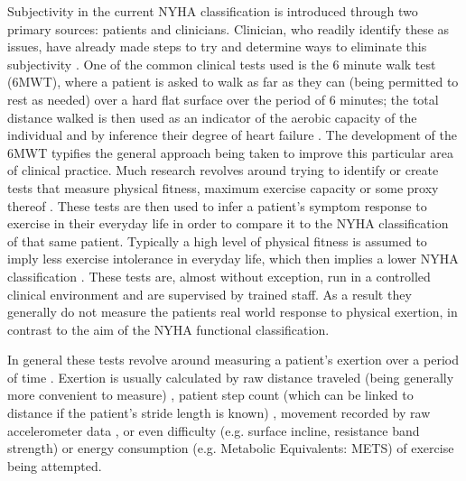 \documentclass[]{article}
\begin{document}
Subjectivity in the current NYHA classification is introduced through two primary sources: patients and clinicians. Clinician, who readily identify these as issues, have already made steps to try and determine ways to eliminate this subjectivity \cite{Bennett2002}. One of the common clinical tests used is the 6 minute walk test (6MWT), where a patient is asked to walk as far as they can (being permitted to rest as needed) over a hard flat surface over the period of 6 minutes; the total distance walked is then used as an indicator of the aerobic capacity of the individual and by inference their degree of heart failure \cite{Roul1998}. The development of the 6MWT typifies the general approach being taken to improve this particular area of clinical practice. Much research revolves around trying to identify or create tests that measure physical fitness, maximum exercise capacity or some proxy thereof \cite{Balady,Uth2004,Kline1987,Cooper1969,Saalasti2012,Butte2012,Ap5072017,Zhao2017}. These tests are then used to infer a patient's symptom response to exercise in their everyday life in order to compare it to the NYHA classification of that same patient. Typically a high level of physical fitness is assumed to imply less exercise intolerance in everyday life, which then implies a lower NYHA classification \cite{Balady,Saalasti2012,Zhao2017}. These tests are, almost without exception, run in a controlled clinical environment and are supervised by trained staff. As a result they generally do not measure the patients real world response to physical exertion, in contrast to the aim of the NYHA functional classification.

In general these tests revolve around measuring a patient's exertion over a period of time \cite{Balady,Cooper1969,Kline1987,Saalasti2012,Ap5072017,Zhao2017,Roul1998}. Exertion is usually calculated by raw distance traveled (being generally more convenient to measure) \cite{Saalasti2012,Kline1987,Balady,Roul1998}, patient step count (which can be linked to distance if the patient's stride length is known) \cite{Abdulmajeed2016,Eapen2016a,Wen2017,El-Amrawy2015,Ap5072017,An2017,Bromberg2015,Abeles2017}, movement recorded by raw accelerometer data \cite{Zhao2017,Bornstein2011,Awais2015,Jehn2013}, or even difficulty (e.g. surface incline, resistance band strength) \cite{Abdulmajeed2016,Bromberg2015} or energy consumption (e.g. Metabolic Equivalents: METS) \cite{HeartFoundation2014,Balady,Butte2012} of exercise being attempted.
\end{document}
